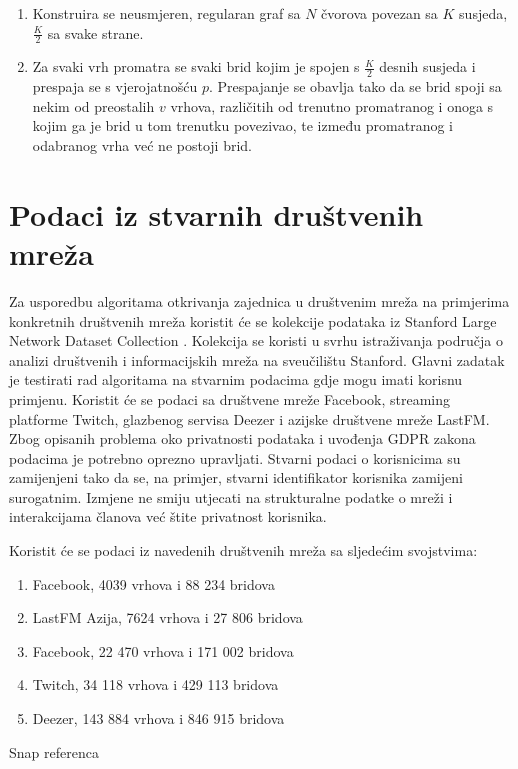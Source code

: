 \begin{enumerate}
	\item Konstruira se neusmjeren, regularan graf sa $N$ čvorova povezan sa $K$ susjeda, $\frac{K}{2}$ sa svake strane.
	\item Za svaki vrh promatra se svaki brid kojim je spojen s $\frac{K}{2}$ desnih susjeda i prespaja se s vjerojatnošću $p$. Prespajanje se obavlja tako da se brid spoji sa nekim od preostalih $v$ vrhova, različitih od trenutno promatranog i onoga s kojim ga je brid u tom trenutku povezivao, te između promatranog i odabranog vrha već ne postoji brid.
\end{enumerate}



\section{Podaci iz stvarnih društvenih mreža}

Za usporedbu algoritama otkrivanja zajednica u društvenim mreža na primjerima konkretnih društvenih mreža koristit će se kolekcije podataka iz Stanford Large Network Dataset Collection \cite{snapnets}. Kolekcija se koristi u svrhu istraživanja područja o analizi društvenih i informacijskih mreža na sveučilištu Stanford. Glavni zadatak je testirati rad algoritama na stvarnim podacima gdje mogu imati korisnu primjenu. Koristit će se podaci sa društvene mreže Facebook, streaming platforme Twitch, glazbenog servisa Deezer i azijske društvene mreže LastFM. Zbog opisanih problema oko privatnosti podataka i uvođenja GDPR zakona podacima je potrebno oprezno upravljati. Stvarni podaci o korisnicima su zamijenjeni tako da se, na primjer, stvarni identifikator korisnika zamijeni surogatnim. Izmjene ne smiju utjecati na strukturalne podatke o mreži i interakcijama članova već štite privatnost korisnika.

Koristit će se podaci iz navedenih društvenih mreža sa sljedećim svojstvima:
\begin{enumerate}
	\item Facebook, 4039 vrhova i 88 234 bridova
	\item LastFM Azija, 7624 vrhova i 27 806 bridova
	\item Facebook, 22 470 vrhova i 171 002 bridova
	\item Twitch, 34 118 vrhova i 429 113 bridova
	\item Deezer, 143 884 vrhova i 846 915 bridova
\end{enumerate}


Snap referenca
\cite{leskovec2016snap}

